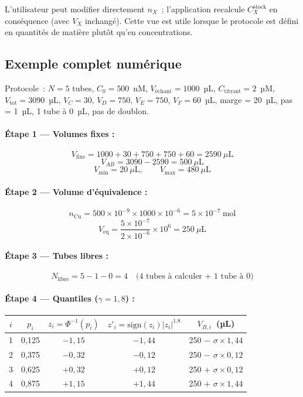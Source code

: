 \documentclass[12pt, a4paper]{article}
\begin{document}
L'utilisateur peut modifier directement $n_X$~; l'application recalcule
$C_X^\text{stock}$ en conséquence (avec $V_X$ inchangé). Cette vue est utile
lorsque le protocole est défini en quantités de matière plutôt qu'en
concentrations.

\subsection{Exemple complet numérique}

Protocole~: $N = 5$ tubes, $C_0 = 500$~nM, $V_\text{échant} = 1000$~µL,
$C_\text{titrant} = 2$~µM, $V_\text{tot} = 3090$~µL, $V_C = 30$, $V_D = 750$,
$V_E = 750$, $V_F = 60$~µL, marge = 20~µL, pas = 1~µL, 1 tube à 0~µL,
pas de doublon.

\paragraph{Étape 1 — Volumes fixes :}
\[
V_\text{fixe} = 1000 + 30 + 750 + 750 + 60 = 2590~\mu\text{L}
\]
\[
V_{AB} = 3090 - 2590 = 500~\mu\text{L}
\]
\[
V_\text{min} = 20~\mu\text{L}, \qquad V_\text{max} = 480~\mu\text{L}
\]

\paragraph{Étape 2 — Volume d'équivalence :}
\[
n_\text{Cu} = 500 \times 10^{-9} \times 1000 \times 10^{-6} = 5 \times 10^{-7}~\text{mol}
\]
\[
V_\text{eq} = \frac{5 \times 10^{-7}}{2 \times 10^{-6}} \times 10^6 = 250~\mu\text{L}
\]

\paragraph{Étape 3 — Tubes libres :}
\[
N_\text{libre} = 5 - 1 - 0 = 4 \quad \text{(4 tubes à calculer + 1 tube à 0)}
\]

\paragraph{Étape 4 — Quantiles ($\gamma = 1{,}8$) :}

\begin{center}
\begin{tabular}{ccccc}
\toprule
$i$ & $p_i$ & $z_i = \Phi^{-1}(p_i)$ & $z'_i = \text{sign}(z_i)|z_i|^{1.8}$ & $V_{B,i}$~(µL) \\
\midrule
1 & 0,125 & $-1{,}15$ & $-1{,}44$ & 250 $-$ $\sigma \times 1{,}44$ \\
2 & 0,375 & $-0{,}32$ & $-0{,}12$ & 250 $-$ $\sigma \times 0{,}12$ \\
3 & 0,625 & $+0{,}32$ & $+0{,}12$ & 250 $+$ $\sigma \times 0{,}12$ \\
4 & 0,875 & $+1{,}15$ & $+1{,}44$ & 250 $+$ $\sigma \times 1{,}44$ \\
\bottomrule
\end{tabular}
\end{center}
\end{document}
